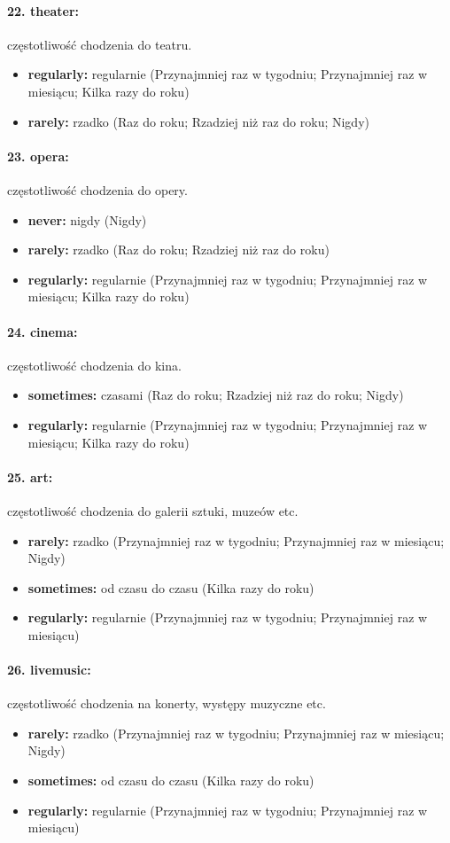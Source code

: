 \documentclass[10pt, a4paper]{article}
\begin{document}
\paragraph{22. theater:} częstotliwość chodzenia do teatru.
\begin{itemize}
	\item {\bf regularly:} regularnie (Przynajmniej raz w tygodniu; Przynajmniej raz w miesiącu; Kilka razy do roku)
	\item {\bf rarely:} rzadko (Raz do roku; Rzadziej niż raz do roku; Nigdy)
\end{itemize}
\paragraph{23. opera:} częstotliwość chodzenia do opery.
\begin{itemize}
	\item {\bf never:} nigdy (Nigdy)
	\item {\bf rarely:} rzadko (Raz do roku; Rzadziej niż raz do roku)
	\item {\bf regularly:} regularnie (Przynajmniej raz w tygodniu; Przynajmniej raz w miesiącu; Kilka razy do roku)
\end{itemize}
\paragraph{24. cinema:} częstotliwość chodzenia do kina.
\begin{itemize}
	\item {\bf sometimes:} czasami (Raz do roku; Rzadziej niż raz do roku; Nigdy)
	\item {\bf regularly:} regularnie (Przynajmniej raz w tygodniu; Przynajmniej raz w miesiącu; Kilka razy do roku)
\end{itemize}
\paragraph{25. art:} częstotliwość chodzenia do galerii sztuki, muzeów etc.
\begin{itemize}
	\item {\bf rarely:} rzadko (Przynajmniej raz w tygodniu; Przynajmniej raz w miesiącu; Nigdy)
	\item {\bf sometimes:} od czasu do czasu (Kilka razy do roku)
	\item {\bf regularly:} regularnie (Przynajmniej raz w tygodniu; Przynajmniej raz w miesiącu)
\end{itemize}
\paragraph{26. livemusic:} częstotliwość chodzenia na konerty, występy muzyczne etc.
\begin{itemize}
	\item {\bf rarely:} rzadko (Przynajmniej raz w tygodniu; Przynajmniej raz w miesiącu; Nigdy)
	\item {\bf sometimes:} od czasu do czasu (Kilka razy do roku)
	\item {\bf regularly:} regularnie (Przynajmniej raz w tygodniu; Przynajmniej raz w miesiącu)
\end{itemize}
\end{document}
